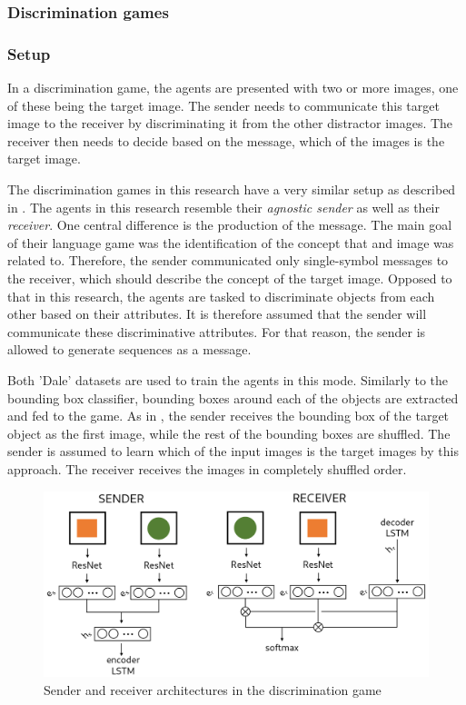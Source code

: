 
\subsubsection{Discrimination games}
\subsubsection*{Setup}

In a discrimination game, the agents are presented with two or more images, one of these being the target image.
The sender needs to communicate this target image to the receiver by discriminating it from the other distractor images.
The receiver then needs to decide based on the message, which of the images is the target image.

The discrimination games in this research have a very similar setup as described in \citet{Lazaridou2016}.
The agents in this research resemble their \emph{agnostic sender} as well as their \emph{receiver}.
One central difference is the production of the message.
The main goal of their language game was the identification of the concept that and image was related to.
Therefore, the sender communicated only single-symbol messages to the receiver, which should describe the concept of the target image.
Opposed to that in this research, the agents are tasked to discriminate objects from each other based on their attributes.
It is therefore assumed that the sender will communicate these discriminative attributes.
For that reason, the sender is allowed to generate sequences as a message.

Both 'Dale' datasets are used to train the agents in this mode.
Similarly to the bounding box classifier, bounding boxes around each of the objects are extracted and fed to the game.
As in \citet{Lazaridou2016}, the sender receives the bounding box of the target object as the first image, while the rest of the bounding boxes are shuffled.
The sender is assumed to learn which of the input images is the target images by this approach.
The receiver receives the images in completely shuffled order.

\begin{figure}[h]
    \centering
    \includegraphics[width=.8\linewidth]{figures/arch_discriminator.png}
    \caption{Sender and receiver architectures in the discrimination game}
    \label{fig:discriminator_architecture}
\end{figure}

